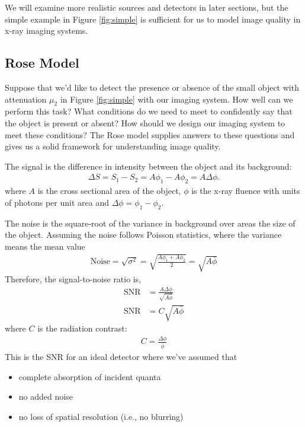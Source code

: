 \documentclass[mphy386-notes.tex]{subfiles}
\begin{document}
We will examine more realistic sources and detectors in later sections, but the
simple example in Figure \ref{fig:simple} is sufficient for us to model image
quality in x-ray imaging systems. 

\subsection{Rose Model}
Suppose that we'd like to detect the presence or absence of the small object
with attenuation $\mu_2$ in Figure \ref{fig:simple} with our imaging system. How
well can we perform this task? What conditions do we need to meet to confidently
say that the object is present or absent? How should we design our imaging
system to meet these conditions? The Rose model supplies answers to these
questions and gives us a solid framework for understanding image quality.



The signal is the difference in intensity between the object and its background:
\begin{align*}
  \Delta S = S_1 - S_2 = A\phi_1 - A\phi_2 = A\Delta\phi.
\end{align*}
where $A$ is the cross sectional area of the object, $\phi$ is the x-ray fluence
with units of photons per unit area and $\Delta\phi = \phi_1-\phi_2$.

The noise is the square-root of the variance in background over areas the size
of the object. Assuming the noise follows Poisson statistics, where the
variance means the mean value
\begin{align}
  \text{Noise} = \sqrt{\sigma^2} = \sqrt{\frac{A\phi_1 + A\phi_2}{2}} = \sqrt{A\bar{\phi}}
\end{align}
Therefore, the signal-to-noise ratio is,
\begin{align}
  \text{SNR} &= \frac{A\Delta\phi}{\sqrt{A\bar{\phi}}}\\
  \text{SNR} &= C\sqrt{A\bar{\phi}} 
\end{align}
where $C$ is the radiation contrast:
\begin{align}
  C = \frac{\Delta\phi}{\bar{\phi}}
\end{align}
This is the SNR for an ideal detector where we've assumed that
\begin{itemize}
\item complete absorption of incident quanta
\item no added noise
\item no loss of spatial resolution (i.e., no blurring)
\end{itemize}


\pagebreak
\end{document}
